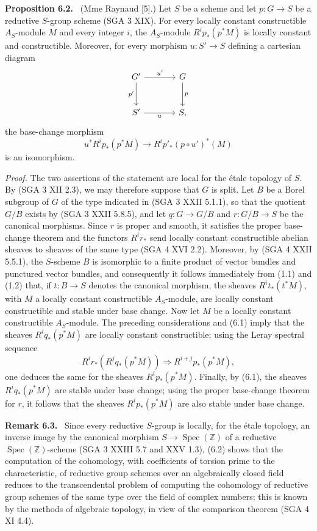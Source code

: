 \documentclass[11pt]{article}
\newenvironment{statement}[1]{\par\medskip\noindent\textbf{#1.}\ }{\par\medskip}
\begin{document}
\begin{statement}{Proposition 6.2}
(Mme Raynaud [5].) Let $S$ be a scheme and let $p:G\to S$ be a reductive $S$-group scheme (SGA 3 XIX). For every locally constant constructible $A_S$-module $M$ and every integer $i$, the $A_S$-module $R^ip_*(p^*M)$ is locally constant and constructible. Moreover, for every morphism $u:S'\to S$ defining a cartesian diagram
\[
\begin{tikzcd}[column sep=large,row sep=large]
G' \arrow[r,"u'"] \arrow[d,"p'"'] & G \arrow[d,"p"]\\
S' \arrow[r,"u"'] & S,
\end{tikzcd}
\]
the base-change morphism
\[
u^*R^ip_*(p^*M)\to R^ip'_*(p\circ u')^*(M)
\]
is an isomorphism.
\end{statement}

\emph{Proof.} The two assertions of the statement are local for the étale topology of $S$. By (SGA 3 XII 2.3), we may therefore suppose that $G$ is split. Let $B$ be a Borel subgroup of $G$ of the type indicated in (SGA 3 XXII 5.1.1), so that the quotient $G/B$ exists by (SGA 3 XXII 5.8.5), and let $q:G\to G/B$ and $r:G/B\to S$ be the canonical morphisms. Since $r$ is proper and smooth, it satisfies the proper base-change theorem and the functors $R^ir_*$ send locally constant constructible abelian sheaves to sheaves of the same type (SGA 4 XVI 2.2). Moreover, by (SGA 4 XXII 5.5.1), the $S$-scheme $B$ is isomorphic to a finite product of vector bundles and punctured vector bundles, and consequently it follows immediately from (1.1) and (1.2) that, if $t:B\to S$ denotes the canonical morphism, the sheaves $R^it_*(t^*M)$, with $M$ a locally constant constructible $A_S$-module, are locally constant constructible and stable under base change. Now let $M$ be a locally constant constructible $A_S$-module. The preceding considerations and (6.1) imply that the sheaves $R^iq_*(p^*M)$ are locally constant constructible; using the Leray spectral sequence
\[
R^ir_*(R^jq_*(p^*M))\Rightarrow R^{i+j}p_*(p^*M),
\]
one deduces the same for the sheaves $R^ip_*(p^*M)$. Finally, by (6.1), the sheaves $R^iq_*(p^*M)$ are stable under base change; using the proper base-change theorem for $r$, it follows that the sheaves $R^ip_*(p^*M)$ are also stable under base change.

\begin{statement}{Remark 6.3}
Since every reductive $S$-group is locally, for the étale topology, an inverse image by the canonical morphism $S\to\operatorname{Spec}(\mathbb Z)$ of a reductive $\operatorname{Spec}(\mathbb Z)$-scheme (SGA 3 XXIII 5.7 and XXV 1.3), (6.2) shows that the computation of the cohomology, with coefficients of torsion prime to the characteristic, of reductive group schemes over an algebraically closed field reduces to the transcendental problem of computing the cohomology of reductive group schemes of the same type over the field of complex numbers; this is known by the methods of algebraic topology, in view of the comparison theorem (SGA 4 XI 4.4).
\end{statement}
\end{document}
